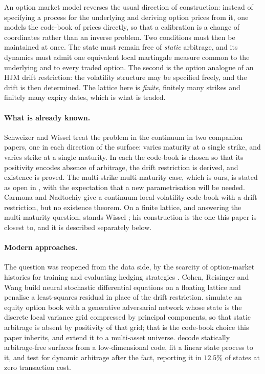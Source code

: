
An option market model reverses the usual direction of construction: instead of
specifying a process for the underlying and deriving option prices from it, one
models the code-book of prices directly, so that a calibration is a change of
coordinates rather than an inverse problem. Two conditions must then be
maintained at once. The state must remain free of \emph{static} arbitrage, and
its dynamics must admit one equivalent local martingale measure common to the
underlying and to every traded option. The second is the option analogue of an
HJM drift restriction: the volatility structure may be specified freely, and the
drift is then determined. The lattice here is \emph{finite}, finitely many
strikes and finitely many expiry dates, which is what is traded.

\paragraph{What is already known.} Schweizer and Wissel treat the problem in the
continuum in two companion papers, one in each direction of the surface:
\cite{Schweizer2007} varies maturity at a single strike, and
\cite{SchweizerWissel2008} varies strike at a single maturity. In each the
code-book is chosen so that its positivity encodes absence of arbitrage, the
drift restriction is derived, and existence is proved. The multi-strike
multi-maturity case, which is ours, is stated as open in
\cite{SchweizerWissel2008}, with the expectation that a new parametrisation will
be needed. Carmona and Nadtochiy
\cite{CarmonaNadtochiy2008} give a continuum local-volatility code-book with a
drift restriction, but no existence theorem. On a finite lattice, and answering
the multi-maturity question, stands Wissel \cite{Wissel2007}; his construction is
the one this paper is closest to, and it is described separately below.

\paragraph{Modern approaches.} The question was reopened from the data side, by
the scarcity of option-market histories for training and evaluating hedging
strategies \cite{BuehlerEtAl2019DeepHedging}. Cohen, Reisinger and Wang
\cite{CohenReisingerWang2021} build neural stochastic differential equations on a
floating lattice and penalise a least-squares residual in place of the drift
restriction.
\cite{WieseEtAl2019OptionMarkets} simulate an equity option book with a
generative adversarial network whose state is the discrete local variance grid
compressed by principal components, so that static arbitrage is absent by
positivity of that grid; that is the code-book choice this paper inherits, and
\cite{WieseEtAl2021MultiAsset} extend it to a multi-asset universe.
\cite{DYSANOS2026} decode statically arbitrage-free surfaces from a
low-dimensional code, fit a linear state process to it, and test for dynamic
arbitrage after the fact, reporting it in $12.5\%$ of states at zero transaction
cost.

